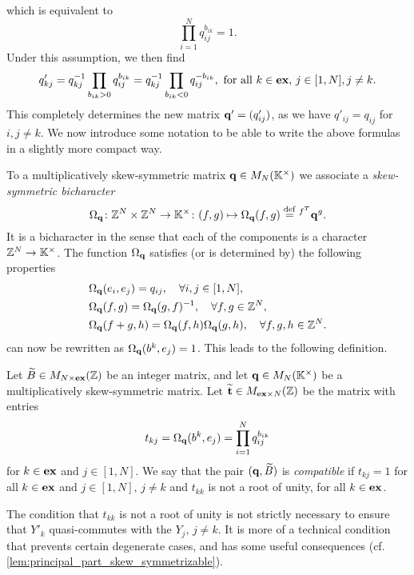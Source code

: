 which is equivalent to
\begin{equation}\label{eq:compatibility_q_b}
	\prod_{i=1}^N q_{ij}^{b_{ik}} = 1.
\end{equation}
%
Under this assumption, we then find
\begin{equation}\label{eq:mutated_q_kj}
	q'_{kj} = q_{kj}^{-1} \prod_{b_{ik} > 0}q_{ij}^{b_{ik}} = q_{kj}^{-1} \prod_{b_{ik} < 0}q_{ij}^{-b_{ik}}, \text{ for all } k \in \mathbf{ex},\, j\in [1, N], j\neq k.
\end{equation}
%
This completely determines the new matrix $\mathbf{q}' = (q'_{ij})$, as we have $q'_{ij} =
	q_{ij}$ for $i,j \neq k$. We now introduce some notation to be able to write the above
formulas in a slightly more compact way.

To a multiplicatively skew-symmetric matrix $\mathbf{q} \in M_N(\mathbb{K}^\times)$ we associate a
\emph{skew-symmetric bicharacter}
\begin{equation*}
	\Omega_{\mathbf{q}} \colon \mathbb{Z}^N \times \mathbb{Z}^N \to \mathbb{K}^\times \colon
	(f,g) \mapsto \Omega_{\mathbf{q}}(f, g) \overset{\mathrm{def}}{=} \prescript{f^T}{}{}\mathbf{q}^g.
\end{equation*}
%
%
It is a bicharacter in the sense that each of the components is a character $\mathbb{Z}^N \to
	\mathbb{K}^\times$. The function $\Omega_{\mathbf{q}}$ satisfies (or is determined by) the following
properties
\begin{align}
	 & \Omega_{\mathbf{q}} (e_i, e_j) = q_{ij}, \quad \forall i, j \in [1, N],\label{eq:Omega_of_basis}                             \\
	 & \Omega_{\mathbf{q}} (f, g) = \Omega_{\mathbf{q}} (g, f)^{-1},\quad \forall f, g \in \mathbb{Z}^N,\label{eq:Omega_skew_symmetric}            \\
	 & \Omega_{\mathbf{q}} (f + g, h) = \Omega_{\mathbf{q}}(f, h)\Omega_{\mathbf{q}}(g, h), \quad \forall f, g, h\in \mathbb{Z}^N.\label{eq:Omega_of_sum}
\end{align}
%
 can now be rewritten as $\Omega_{\mathbf{q}}(b^k, e_j) = 1$. This leads to the following definition.
\begin{definition}\label{def:compatible_pair}

	Let $\widetilde{B} \in M_{N \times \mathbf{ex}}(\mathbb{Z})$ be an integer matrix, and let $\mathbf{q} \in
		M_N(\mathbb{K}^\times)$ be a multiplicatively skew-symmetric matrix. Let $\widetilde{\mathbf{t}}\in M_{\mathbf{ex}
				\times N}(\mathbb{Z})$ be the matrix with entries
	\begin{equation*}
		t_{kj} = \Omega_{\mathbf{q}}(b^k, e_j) = \prod_{i=1}^N q_{ij}^{b_{ik}}
	\end{equation*}
	for $k \in \mathbf{ex}$ and $j \in [1, N]$. We say that the pair $(\mathbf{q}, \widetilde{B})$ is \emph{compatible} if $t_{kj} = 1$ for all $k \in \mathbf{ex}$ and $j \in [1, N],\, j\neq k$ and  $t_{kk}$ is not a root of unity, for all $k\in \mathbf{ex}$.
\end{definition}
\begin{remark}
	The condition that $t_{kk}$ is not a root of unity is not strictly necessary to ensure that $Y'_k$ quasi-commutes with the $Y_j,\, j\neq k$. It is more of a technical condition that prevents certain degenerate cases, and has some useful consequences (cf. \cref{lem:principal_part_skew_symmetrizable}).
\end{remark}
%

